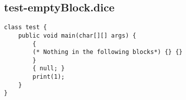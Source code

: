 \subsection{test-emptyBlock.dice}
\begin{verbatim}
class test {
	public void main(char[][] args) {
		{
		(* Nothing in the following blocks*) {} {}
		}
		{ null; }
		print(1);
	}
}

\end{verbatim}
